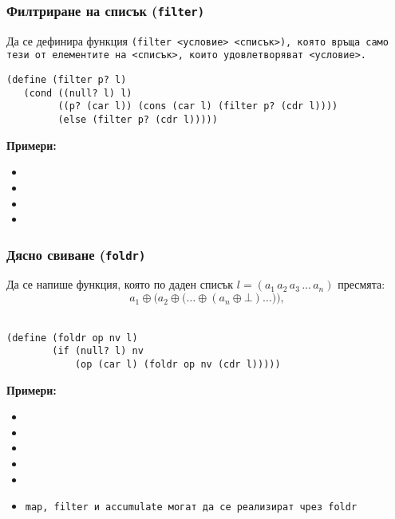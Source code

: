 \documentclass{beamer}
\begin{document}
\begin{frame}[fragile]
  \frametitle{Филтриране на списък (\tt{filter})}

  Да се дефинира функция \tt{(filter }<условие> <списък>\tt), която връща само тези от елементите на <списък>, които удовлетворяват <условие>.
\pause
\small
\begin{lstlisting}
(define (filter p? l)
   (cond ((null? l) l)
         ((p? (car l)) (cons (car l) (filter p? (cdr l))))
         (else (filter p? (cdr l)))))
\end{lstlisting}
\pause
  \textbf{Примери:}
  \begin{itemize}[<+->]
  \item {}
  \item {}
  \item \scriptsize{}
  \item {}
  \end{itemize}

\end{frame}

\begin{frame}[fragile]
  \frametitle{Дясно свиване (\tt{foldr})}

  Да се напише функция, която по даден списък $l = (a_1\,a_2\,a_3\,\ldots\,a_n)$ пресмята:
  \begin{equation*}
    a_1 \oplus \Big(a_2 \oplus \big(\ldots \oplus (a_n \oplus \bot) \ldots\big)\Big),
  \end{equation*}\\[-0.5em]
  \pause
\begin{lstlisting}
(define (foldr op nv l)
        (if (null? l) nv
            (op (car l) (foldr op nv (cdr l)))))
\end{lstlisting}
  \pause
  \textbf{Примери:}
  \small
  \begin{itemize}[<+->]
  \item {}
  \item {}
  \item {}
  \item {}
  \item {}
  \item \tt{map}, \tt{filter} и \tt{accumulate} могат да се реализират чрез \tt{foldr}
  \end{itemize}

\end{frame}
\end{document}
